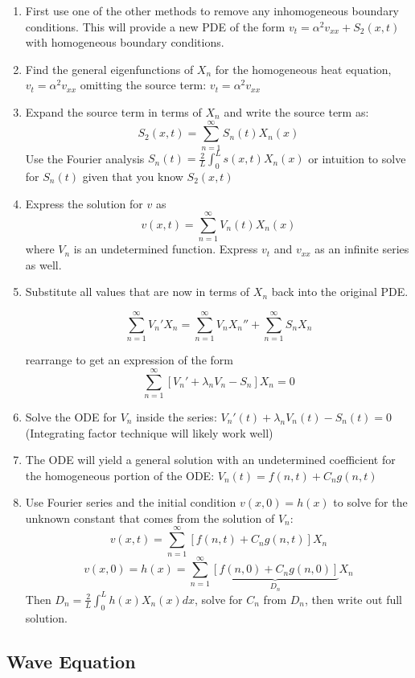 \documentclass[11pt, fleqn]{article}
\begin{document}
\begin{enumerate}
    \begin{enumerate}
        \item First use one of the other methods to remove any inhomogeneous boundary conditions. This will provide a new PDE of the form $v_t=\alpha^2v_{xx}+S_2(x,t)$ with homogeneous boundary conditions.
        \item Find the general eigenfunctions of $X_n$ for the homogeneous heat equation, $v_t = \alpha^2 v_{xx}$  omitting the source term: $v_t=\alpha^2v_{xx}$
        \item Expand the source term in terms of $X_n$ and write the source term as:
        $$S_2(x,t)=\sum_{n=1}^\infty S_n(t)X_n(x)$$
        Use the Fourier analysis $S_n(t) = \frac{2}{L}\int_0^{L} s(x,t)X_n(x)$ or intuition to solve for $S_n(t)$ given that you know $S_2(x,t)$
        \item Express the solution for $v$ as
        $$v(x,t)=\sum_{n=1}^\infty V_n(t)X_n(x)$$
        where $V_n$ is an undetermined function.  Express $v_t$ and $v_{xx}$ as an infinite series as well.
        \item  Substitute all values that are now in terms of $X_n$ back into the original PDE.  
        
        $$\sum_{n=1}^\infty V_n'X_n = \sum_{n=1}^\infty V_n X_n'' + \sum_{n=1}^\infty S_nX_n$$
        
        rearrange to get an expression of the form
        $$\sum_{n=1}^\infty [V_n'+\lambda_n V_n - S_n]X_n=0$$
        \item Solve the ODE for $V_n$ inside the series: $V_n'(t)+\lambda_n V_n(t) - S_n(t)=0$ (Integrating factor technique will likely work well)
        \item The ODE will yield a general solution with an undetermined coefficient for the homogeneous portion of the ODE: $V_n(t) = f(n,t) + C_n g(n,t)$
        \item Use Fourier series and the initial condition $v(x,0)=h(x)$ to solve for the unknown constant that comes from the solution of $V_n$: 
        $$v(x,t) = \sum_{n=1}^\infty[f(n,t) + C_n g(n,t)]X_n$$
        $$v(x,0) = h(x) = \sum_{n=1}^\infty\underbrace{[f(n,0) + C_n g(n,0)]}_{D_n}X_n$$
        Then $D_n = \frac{2}{L}\int_0^{L} h(x)X_n(x)dx$, solve for $C_n$ from $D_n$, then write out full solution.
    \end{enumerate}
\end{enumerate}

\subsection{Wave Equation}
\end{document}
